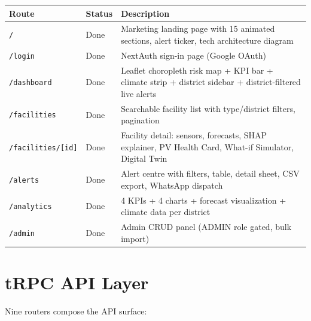 \documentclass[12pt,a4paper]{report}
\begin{document}
\begin{tabularx}{\textwidth}{llX}
\toprule
\textbf{Route} & \textbf{Status} & \textbf{Description} \\
\midrule
\texttt{/}               & Done  & Marketing landing page with 15 animated sections, alert ticker, tech architecture diagram \\
\texttt{/login}          & Done  & NextAuth sign-in page (Google OAuth) \\
\texttt{/dashboard}      & Done  & Leaflet choropleth risk map + KPI bar + climate strip + district sidebar + district-filtered live alerts \\
\texttt{/facilities}     & Done  & Searchable facility list with type/district filters, pagination \\
\texttt{/facilities/[id]}& Done  & Facility detail: sensors, forecasts, SHAP explainer, PV Health Card, What-if Simulator, Digital Twin \\
\texttt{/alerts}         & Done  & Alert centre with filters, table, detail sheet, CSV export, WhatsApp dispatch \\
\texttt{/analytics}      & Done  & 4 KPIs + 4 charts + forecast visualization + climate data per district \\
\texttt{/admin}          & Done  & Admin CRUD panel (ADMIN role gated, bulk import) \\
\bottomrule
\end{tabularx}

\section{tRPC API Layer}

Nine routers compose the API surface:
\end{document}
